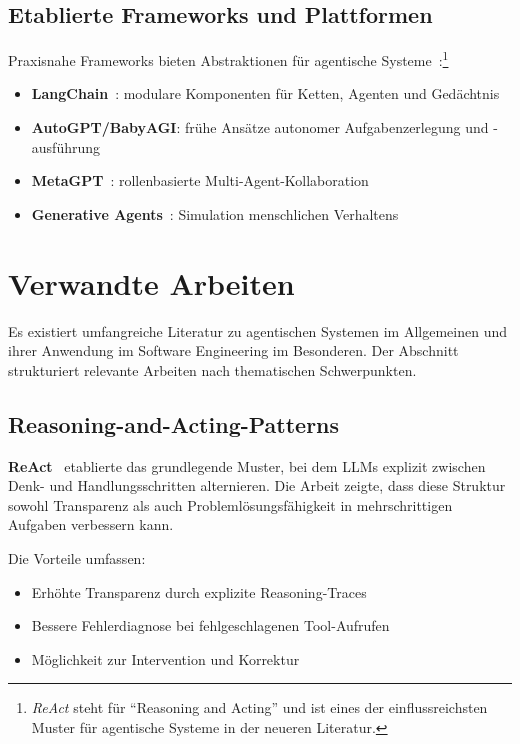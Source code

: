 \subsection{Etablierte Frameworks und Plattformen}

Praxisnahe Frameworks bieten Abstraktionen für agentische Systeme~\cite{wu2023autogen}:\footnote{\emph{ReAct} steht für \enquote{Reasoning and Acting} und ist eines der einflussreichsten Muster für agentische Systeme in der neueren Literatur.}

\begin{itemize}
  \item \textbf{LangChain}~\cite{chase2023langchain}: modulare Komponenten für Ketten, Agenten und Gedächtnis
  \item \textbf{AutoGPT/BabyAGI}: frühe Ansätze autonomer Aufgabenzerlegung und -ausführung
  \item \textbf{MetaGPT}~\cite{hong2023metagpt}: rollenbasierte Multi-Agent-Kollaboration
  \item \textbf{Generative Agents}~\cite{park2023generative}: Simulation menschlichen Verhaltens
\end{itemize}

\section{Verwandte Arbeiten}

Es existiert umfangreiche Literatur zu agentischen Systemen im Allgemeinen und ihrer Anwendung im Software Engineering im Besonderen. Der Abschnitt strukturiert relevante Arbeiten nach thematischen Schwerpunkten.

\subsection{Reasoning-and-Acting-Patterns}

\textbf{ReAct}~\cite{yao2023react} etablierte das grundlegende Muster, bei dem LLMs explizit zwischen Denk- und Handlungsschritten alternieren. Die Arbeit zeigte, dass diese Struktur sowohl Transparenz als auch Problemlösungsfähigkeit in mehrschrittigen Aufgaben verbessern kann.


Die Vorteile umfassen:
\begin{itemize}
  \item Erhöhte Transparenz durch explizite Reasoning-Traces
  \item Bessere Fehlerdiagnose bei fehlgeschlagenen Tool-Aufrufen
  \item Möglichkeit zur Intervention und Korrektur
\end{itemize}

